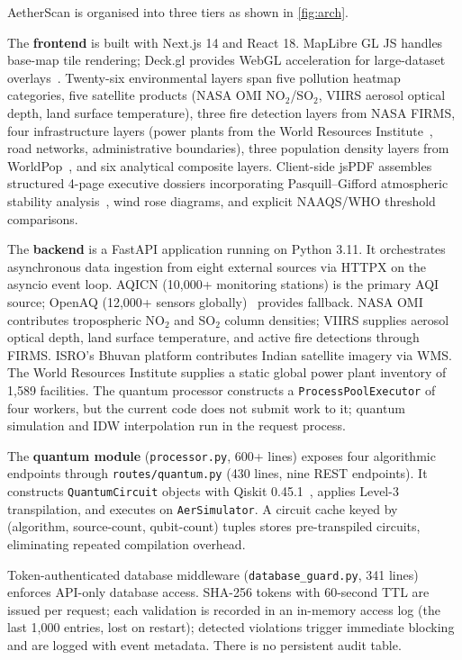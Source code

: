 \documentclass[conference]{IEEEtran}
\begin{document}
AetherScan is organised into three tiers as shown in \cref{fig:arch}.

The \textbf{frontend} is built with Next.js 14 and React 18.
MapLibre GL JS handles base-map tile rendering; Deck.gl provides WebGL
acceleration for large-dataset overlays~\cite{deckgl2019}.
Twenty-six environmental layers span five pollution heatmap categories,
five satellite products (NASA OMI NO$_2$/SO$_2$, VIIRS aerosol optical
depth, land surface temperature), three fire detection layers from NASA
FIRMS, four infrastructure layers (power plants from the World Resources
Institute~\cite{wri2019}, road networks, administrative boundaries), three
population density layers from WorldPop~\cite{worldpop2018}, and six
analytical composite layers.
Client-side jsPDF assembles structured 4-page executive dossiers incorporating Pasquill--Gifford
atmospheric stability analysis~\cite{slade1968meteorology}, wind rose
diagrams, and explicit NAAQS/WHO threshold comparisons.

The \textbf{backend} is a FastAPI application running on Python 3.11.
It orchestrates asynchronous data ingestion from eight external sources
via HTTPX on the asyncio event loop.
AQICN (10,000+ monitoring stations) is the primary AQI source; OpenAQ
(12,000+ sensors globally)~\cite{openaq2016} provides fallback.
NASA OMI contributes tropospheric NO$_2$ and SO$_2$ column densities;
VIIRS supplies aerosol optical depth, land surface temperature, and active
fire detections through FIRMS.
ISRO's Bhuvan platform contributes Indian satellite imagery via WMS.
The World Resources Institute supplies a static global power plant
inventory of 1,589 facilities.
The quantum processor constructs a \texttt{ProcessPoolExecutor} of four
workers, but the current code does not submit work to it; quantum simulation
and IDW interpolation run in the request process.

The \textbf{quantum module} (\texttt{processor.py}, 600+ lines) exposes
four algorithmic endpoints through \texttt{routes/quantum.py} (430 lines,
nine REST endpoints).
It constructs \texttt{QuantumCircuit} objects with Qiskit 0.45.1~\cite{javadi2024qiskit},
applies Level-3 transpilation, and executes on \texttt{AerSimulator}.
A circuit cache keyed by (algorithm, source-count, qubit-count) tuples
stores pre-transpiled circuits, eliminating repeated compilation overhead.

Token-authenticated database middleware (\texttt{database\_guard.py},
341 lines) enforces API-only database access.
SHA-256 tokens with 60-second TTL are issued per request; each validation
is recorded in an in-memory access log (the last 1,000 entries, lost on
restart); detected violations trigger immediate blocking and are logged
with event metadata. There is no persistent audit table.
\end{document}
